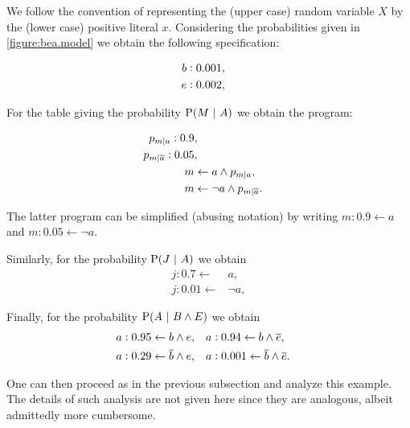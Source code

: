 \documentclass[a4paper]{article}
\newcommand{\at}[1]{\ensuremath{\!\del{#1}}}        %
\newcommand{\clause}{\ensuremath{\leftarrow}}
\newcommand{\co}[1]{\ensuremath{\overline{#1}}}     %
\newcommand{\prfunc}{\ensuremath{\mathrm{P}}}
\newcommand{\pr}[1]{\ensuremath{\prfunc\at{#1}}}
\newcommand{\given}{\ensuremath{~\middle|~}}
\newcommand{\probfact}[2]{\ensuremath{#1:#2}}
\newcommand{\probrule}[3]{\probfact{#1}{#2} \leftarrow #3}
\newcommand{\condsymb}[2]{\ensuremath{p_{#1|#2}}}
\begin{document}
We follow the convention of representing the (upper case) random
variable \(X\) by the (lower case) positive literal \(x\).
%
Considering the probabilities given in \cref{figure:bea.model} we obtain
the following specification:

\begin{equation*}
    \begin{aligned}
        \probfact{b}{0.001} & ,\cr \probfact{e}{0.002} & ,\cr \end{aligned}
    \label{eq:not_so_simple_example}
\end{equation*}

For the table giving the probability \(\pr{M \given A}\) we obtain the
program:

\begin{equation*}
    \begin{aligned}
        \probfact{\condsymb{m}{a}}{0.9} & ,\cr \probfact{\condsymb{m}{\co{a}}}{0.05} & ,\cr m & \clause a \wedge \condsymb{m}{a},\cr m & \clause \neg a \wedge \condsymb{m}{\co{a}}.
    \end{aligned}
\end{equation*}

The latter program can be simplified (abusing notation) by writing
\(\probrule{m}{0.9}{a}\) and \(\probrule{m}{0.05}{\neg a}\).

Similarly, for the probability \(\pr{J \given A}\) we obtain
\begin{equation*}
    \begin{aligned}
        \probrule{j}{0.7}{  & a},      \\
        \probrule{j}{0.01}{ & \neg a},
    \end{aligned}
\end{equation*}

Finally, for the probability \(\pr{A \given B \wedge E}\) we obtain
\begin{equation*}
    \begin{aligned}
        \probrule{a}{0.95}{b \wedge e},                                              &  &  &
        \probrule{a}{0.94}{b \wedge \co{e}},\cr \probrule{a}{0.29}{\co{b} \wedge e}, &  &  &
        \probrule{a}{0.001}{\co{b} \wedge \co{e}}.
    \end{aligned}\label{eq:prA.given.B.and.E}
\end{equation*}

One can then proceed as in the previous subsection and analyze this
example.  The details of such analysis are not given here since they
are analogous, albeit admittedly more cumbersome.
\end{document}
